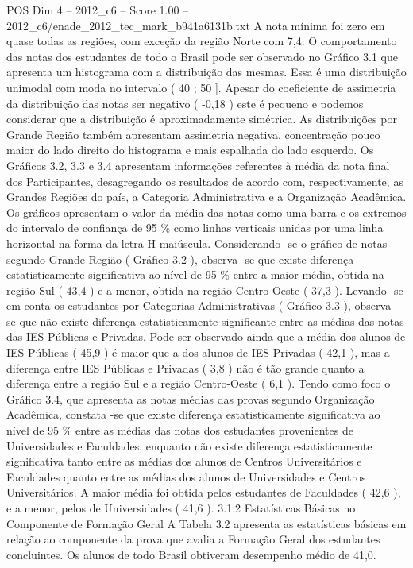 \begin{textsample}{POS Dim 4 – 2012\_c6 – Score 1.00 – 2012\_c6/enade\_2012\_tec\_mark\_b941a6131b.txt}
A nota mínima foi zero em quase todas as regiões, com exceção da região Norte com 7,4.
O comportamento das notas dos estudantes de todo o Brasil pode ser observado no Gráfico 3.1 que apresenta um histograma com a distribuição das mesmas.
Essa é uma distribuição unimodal com moda no intervalo ( 40 ; 50 ].
Apesar do coeficiente de assimetria da distribuição das notas ser negativo ( -0,18 ) este é pequeno e podemos considerar que a distribuição é aproximadamente simétrica.
As distribuições por Grande Região também apresentam assimetria negativa, concentração pouco maior do lado direito do histograma e mais espalhada do lado esquerdo.
Os Gráficos 3.2, 3.3 e 3.4 apresentam informações referentes à média da nota final dos Participantes, desagregando os resultados de acordo com, respectivamente, as Grandes Regiões do país, a Categoria Administrativa e a Organização Acadêmica.
Os gráficos apresentam o valor da média das notas como uma barra e os extremos do intervalo de confiança de 95 \% como linhas verticais unidas por uma linha horizontal na forma da letra H maiúscula.
Considerando -se o gráfico de notas segundo Grande Região ( Gráfico 3.2 ), observa -se que existe diferença estatisticamente significativa ao nível de 95 \% entre a maior média, obtida na região Sul ( 43,4 ) e a menor, obtida na região Centro-Oeste ( 37,3 ).
Levando -se em conta os estudantes por Categorias Administrativas ( Gráfico 3.3 ), observa -se que não existe diferença estatisticamente significante entre as médias das notas das IES Públicas e Privadas.
Pode ser observado ainda que a média dos alunos de IES Públicas ( 45,9 ) é maior que a dos alunos de IES Privadas ( 42,1 ), mas a diferença entre IES Públicas e Privadas ( 3,8 ) não é tão grande quanto a diferença entre a região Sul e a região Centro-Oeste ( 6,1 ).
Tendo como foco o Gráfico 3.4, que apresenta as notas médias das provas segundo Organização Acadêmica, constata -se que existe diferença estatisticamente significativa ao nível de 95 \% entre as médias das notas dos estudantes provenientes de Universidades e Faculdades, enquanto não existe diferença estatisticamente significativa tanto entre as médias dos alunos de Centros Universitários e Faculdades quanto entre as médias dos alunos de Universidades e Centros Universitários.
A maior média foi obtida pelos estudantes de Faculdades ( 42,6 ), e a menor, pelos de Universidades ( 41,6 ). 3.1.2 Estatísticas Básicas no Componente de Formação Geral A Tabela 3.2 apresenta as estatísticas básicas em relação ao componente da prova que avalia a Formação Geral dos estudantes concluintes.
Os alunos de todo Brasil obtiveram desempenho médio de 41,0.

\end{textsample}
